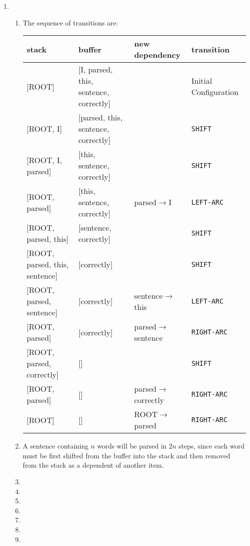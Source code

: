 \documentclass[10pt,reqno]{amsart}
\begin{document}
\begin{enumerate}[topsep=0pt,itemsep=3ex,partopsep=1ex,parsep=1ex]
\item
  \begin{enumerate}[itemsep=2ex]
  \item The sequence of transitions are:
    \vspace{1mm}
    \begin{center}
      \begin{tabular}{l|l|l|l}
        stack & buffer & new dependency & transition \\
        \hline
        {[ROOT]} & [I, parsed, this, sentence, correctly] &  & Initial Configuration \\
        {[ROOT, I]} & [parsed, this, sentence, correctly] &  & \texttt{SHIFT} \\
        {[ROOT, I, parsed]} & [this, sentence, correctly] &  & \texttt{SHIFT} \\
        {[ROOT, parsed]} & [this, sentence, correctly] & parsed$\to$I & \texttt{LEFT-ARC} \\
        {[ROOT, parsed, this]} & [sentence, correctly] &  & \texttt{SHIFT} \\
        {[ROOT, parsed, this, sentence]} & [correctly] &  & \texttt{SHIFT} \\
        {[ROOT, parsed, sentence]} & [correctly] & sentence$\to$this  & \texttt{LEFT-ARC} \\
        {[ROOT, parsed]} & [correctly] & parsed$\to$sentence  & \texttt{RIGHT-ARC} \\
        {[ROOT, parsed, correctly]} & [] &  & \texttt{SHIFT} \\
        {[ROOT, parsed]} & [] & parsed$\to$correctly & \texttt{RIGHT-ARC} \\
        {[ROOT]} & [] & ROOT$\to$parsed & \texttt{RIGHT-ARC} \\
      \end{tabular}
    \end{center}
    \vspace{1mm}
  \item A sentence containing $n$ words will be parsed in $2n$ steps,
    since each word must be first shifted from the buffer into the stack and
    then removed from the stack as a dependent of another item. 
  \item
  \item
  \item 
  \item 
  \item 
  \item 
  \item 
  \end{enumerate}



\end{enumerate}
\end{document}
